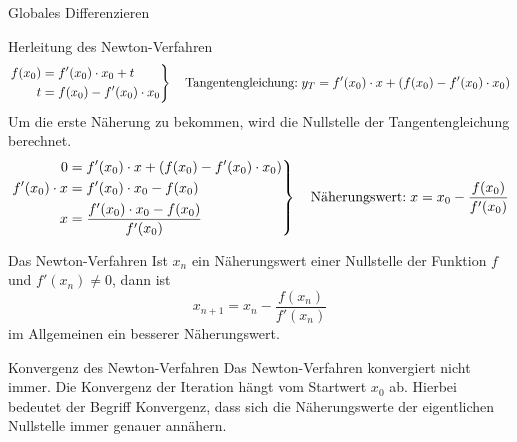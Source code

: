 \begin{section}{Globales Differenzieren}
\begin{bsp*}{Herleitung des Newton-Verfahren}
    \begin{equation*}
	\left.\begin{aligned}
	f(x_0) &= f'(x_0) \cdot x_0 + t \\
	t &= f(x_0) - f'(x_0) \cdot x_0 
	\end{aligned}
	\right\}
\quad \text{Tangentengleichung:}\hspace{0.1cm } y_T = f'(x_0) \cdot x + (f(x_0) - f'(x_0) \cdot x_0 )
\end{equation*}
Um die erste Näherung zu bekommen, wird die Nullstelle der Tangentengleichung berechnet.
    \begin{equation*}
	\left.\begin{aligned}
	0 &=  f'(x_0) \cdot x + (f(x_0) - f'(x_0) \cdot x_0 ) \\
	f'(x_0) \cdot x &= f'(x_0)\cdot x_0  - f(x_0)\\
    x &=\dfrac{f'(x_0)\cdot x_0  - f(x_0)}{f'(x_0)}
	\end{aligned}
	\right\}
\quad \text{Näherungswert:}\hspace{0.1cm } x = x_0 -\dfrac{f(x_0)}{f'(x_0)}
\end{equation*}
\end{bsp*}
\begin{defi}{Das Newton-Verfahren}{}
    Ist $x_n$ ein Näherungswert einer Nullstelle der Funktion $f$ und $f'(x_n)\neq 0$, dann ist $$x_{n+1} = x_n -\dfrac{f(x_n)}{f'(x_n)}$$ im Allgemeinen ein besserer Näherungswert.
\end{defi}
\begin{bem}{Konvergenz des Newton-Verfahren}{}
    Das Newton-Verfahren konvergiert nicht immer. Die Konvergenz der Iteration hängt vom Startwert $x_0$ ab. Hierbei bedeutet der Begriff Konvergenz, dass sich die Näherungswerte der eigentlichen Nullstelle immer genauer annähern.
\end{bem}
\end{section}
